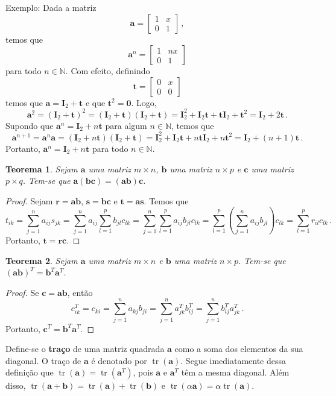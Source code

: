 \documentclass[12pt,a4paper]{report}
\newcommand{\mb}{\mathbf}
\newcommand{\dpar}[1]{\left(#1\right)}
\newcommand{\N}{\mathbb{N}}
\newtheorem{thm}{Teorema}[chapter]
\DeclareMathOperator{\tr}{tr}
\begin{document}
Exemplo: Dada a matriz
$$\mb a=\begin{bmatrix}
  1&x\\
  0&1
\end{bmatrix}\,,$$
temos que
$$\mb a^n=\begin{bmatrix}
  1&nx\\
  0&1
\end{bmatrix}$$
para todo $n\in\N$. Com efeito, definindo
$$\mb t=\begin{bmatrix}
  0&x\\
  0&0
\end{bmatrix}$$
temos que $\mb a=\mb I_2+\mb t$ e que $\mb t^2=\mb 0$. Logo,
$$\mb a^2=(\mb I_2+\mb t)^2=(\mb I_2+\mb t)(\mb I_2+\mb t)=\mb I_2^2+\mb I_2\mb t+\mb t\mb I_2+\mb t^2=\mb I_2+2\mb t\,.$$
Supondo que $\mb a^n=\mb I_2+n\mb t$ para algum $n\in\N$, temos que
$$\mb a^{n+1}=\mb a^n\mb a=(\mb I_2+n\mb t)(\mb I_2+\mb t)=\mb I_2^2+\mb I_2\mb t+n\mb t\mb I_2+n\mb t^2=\mb I_2+(n+1)\mb t\,.$$
Portanto, $\mb a^n=\mb I_2+n\mb t$ para todo $n\in\N$.

\begin{thm}
  Sejam $\mb a$ uma matriz $m\times n$, $\mb b$ uma matriz $n\times p$ e $\mb c$ uma matriz $p\times q$. Tem-se que $\mb a(\mb {bc})=(\mb{ab})\mb c$.
\end{thm}
\begin{proof}
  Sejam $\mb r=\mb{ab}$, $\mb s=\mb {bc}$ e $\mb t=\mb {as}$. Temos que
  $$t_{ik}=\sum_{j=1}^na_{ij}s_{jk}=\sum_{j=1}^na_{ij}\sum_{l=1}^pb_{jl}c_{lk}=\sum_{j=1}^n\sum_{l=1}^pa_{ij}b_{jl}c_{lk}=\sum_{l=1}^p\dpar{\sum_{j=1}^na_{ij}b_{jl}}c_{lk}=\sum_{l=1}^pr_{il}c_{lk}\,.$$
  Portanto, $\mb t=\mb {rc}$.
\end{proof}

\begin{thm}
  Sejam $\mb a$ uma matriz $m\times n$ e $\mb b$ uma matriz $n\times p$. Tem-se que $(\mb a\mb b)^T=\mb b^T\mb a^T$.
\end{thm}
\begin{proof}
  Se $\mb c=\mb {ab}$, então
  $$c^T_{ik}=c_{ki}=\sum_{j=1}^na_{kj}b_{ji}=\sum_{j=1}^na_{jk}^Tb_{ij}^T=\sum_{j=1}^nb_{ij}^Ta_{jk}^T\,.$$
  Portanto, $\mb c^T=\mb b^T\mb a^T$.
\end{proof}

Define-se o \textbf{traço} de uma matriz quadrada $\mb a$ como a soma dos elementos da sua diagonal. O traço de $\mb a$ é denotado por $\tr(\mb a)$. Segue imediatamente dessa definição que $\tr(\mb a)=\tr(\mb a^T)$, pois $\mb a$ e $\mb a^T$ têm a mesma diagonal. Além disso, $\tr(\mb a+\mb b)=\tr(\mb a)+\tr(\mb b)$ e $\tr(\alpha\mb a)=\alpha\tr(\mb a)$.
\end{document}
